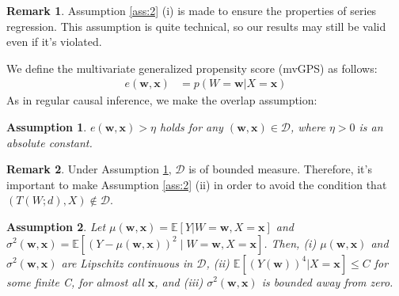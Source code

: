 \documentclass[11pt]{article}
\numberwithin{equation}{section}
\newtheorem{assumption}{Assumption}[section]
\theoremstyle{definition}
\newtheorem{remark}{Remark}[section]
\begin{document}
\begin{remark} Assumption \ref{ass:2} (i) is made to ensure the properties of series regression. This assumption is quite technical, so our results may still be valid even if it's violated.
\end{remark}

We define the multivariate generalized propensity score (mvGPS) as follows:
\begin{align}
    e(\mathbf{w},\mathbf{x}) &= p(W=\mathbf{w}|X=\mathbf{x})
\end{align}
As in regular causal inference, we make the overlap assumption:

\begin{assumption}\label{ass:3}
$e(\mathbf{w},\mathbf{x})>\eta$ holds for any $(\mathbf{w},\mathbf{x}) \in \mathcal{D}$, where $\eta>0$ is an absolute constant.
\end{assumption}

\begin{remark} 
Under Assumption \ref{ass:3}, $\mathcal{D}$ is of bounded measure. Therefore, it's important to make Assumption \ref{ass:2} (ii) in order to avoid the condition that $(T(W;d),X) \notin \mathcal{D}$.
\end{remark}

\begin{assumption} \label{ass:4}
Let $\mu(\mathbf{w},\mathbf{x})=\mathbb{E}\left[Y|W=\mathbf{w}, X=\mathbf{x}\right]$  and  $\sigma^{2}(\mathbf{w},\mathbf{x})=\mathbb{E}\left[\left(Y-\mu(\mathbf{w},\mathbf{x})\right)^{2} \mid W=\mathbf{w} ,X=\mathbf{x}\right]$. Then, (i) $\mu(\mathbf{w},\mathbf{x})$  and  $\sigma^{2}(\mathbf{w},\mathbf{x})$ are Lipschitz continuous in $\mathcal{D}$, (ii)  $\mathbb{E}[(Y(\mathbf{w}))^{4}|X=\mathbf{x}] \leq C$  for some finite  C, for almost all $\mathbf{x}$, and (iii)  $\sigma^{2}(\mathbf{w},\mathbf{x})$  is bounded away from zero.
\end{assumption}
\end{document}
